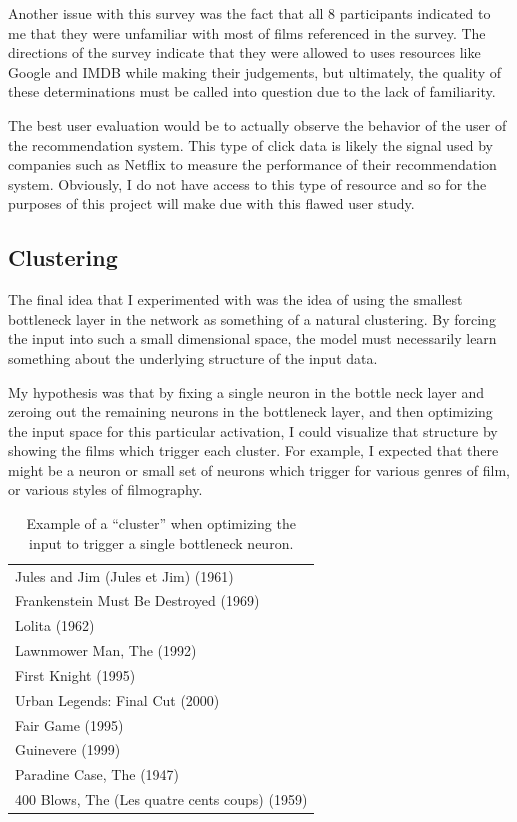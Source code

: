 \documentclass[12pt]{article}
\begin{document}
Another issue with this survey was the fact that all 8 participants indicated
to me that they were unfamiliar with most of films referenced in the survey.
The directions of the survey indicate that they were allowed to uses resources
like Google and IMDB while making their judgements, but ultimately, the
quality of these determinations must be called into question due to the lack
of familiarity.

The best user evaluation would be to actually observe the behavior of the
user of the recommendation system.
This type of click data is likely the signal used by companies such as Netflix
to measure the performance of their recommendation system.
Obviously, I do not have access to this type of resource and so for the
purposes of this project will make due with this flawed user study.

\subsection{Clustering}

The final idea that I experimented with was the idea of using the smallest
bottleneck layer in the network as something of a natural clustering.
By forcing the input into such a small dimensional space, the model must
necessarily learn something about the underlying structure of the input data.

My hypothesis was that by fixing a single neuron in the bottle neck layer and
zeroing out the remaining neurons in the bottleneck layer, and then optimizing
the input space for this particular activation, I could visualize that
structure by showing the films which trigger each cluster.
For example, I expected that there might be a neuron or small set of neurons
which trigger for various genres of film, or various styles of filmography.

\begin{table}
\centering
\begin{tabular}{|l|}
\hline
Jules and Jim (Jules et Jim) (1961)\\
Frankenstein Must Be Destroyed (1969)\\
Lolita (1962)\\
Lawnmower Man, The (1992)\\
First Knight (1995)\\
Urban Legends: Final Cut (2000)\\
Fair Game (1995)\\
Guinevere (1999)\\
Paradine Case, The (1947)\\
400 Blows, The (Les quatre cents coups) (1959)\\
\hline
\end{tabular}
\caption{Example of a ``cluster'' when optimizing the input to trigger a single
bottleneck neuron.}
\label{tab:cluster}
\end{table}
\end{document}
